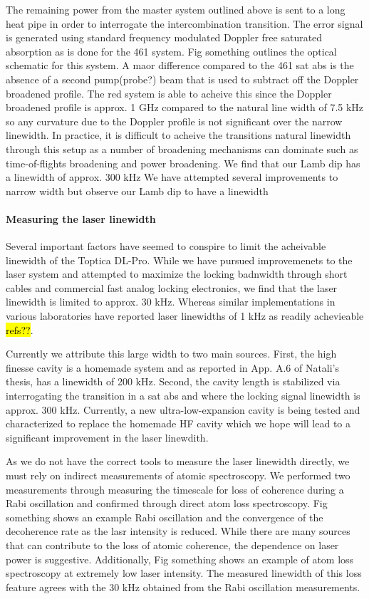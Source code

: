 The remaining power from the master system outlined above is sent to a long heat pipe in order to interrogate the intercombination transition.
The error signal is generated using standard frequency modulated Doppler free saturated absorption as is done for the 461 system.
Fig something outlines the optical schematic for this system.
A maor difference compared to the 461 sat abs is the absence of a second pump(probe?) beam that is used to subtract off the Doppler broadened profile.
The red system is able to acheive this since the Doppler broadened profile is approx. 1 GHz compared to the natural line width of 7.5 kHz so any curvature due to the Doppler profile is not significant over the narrow linewidth.
In practice, it is difficult to acheive the transitions natural linewidth through this setup as a number of broadening mechanisms can dominate such as time-of-flights broadening and power broadening.
We find that our Lamb dip has a linewidth of approx. 300 kHz
We have attempted several improvements to narrow width but observe our Lamb dip to have a linewidth 


\paragraph{Measuring the laser linewidth}
Several important factors have seemed to conspire to limit the acheivable linewidth of the Toptica DL-Pro.
While we have pursued improvemenets to the laser system and attempted to maximize the locking badnwidth through short cables and commercial fast analog locking electronics, we find that the laser linewidth is limited to approx. 30 kHz.
Whereas similar implementations in various laboratories have reported laser linewidths of 1 kHz as readily achevieable \hl{refs??}.

Currently we attribute this large width to two main sources. 
First, the high finesse cavity is a homemade system and as reported in App. A.6 of Natali's thesis, has a linewidth of 200 kHz. 
Second, the cavity length is stabilized via interrogating the transition in a sat abs and where the locking signal linewidth is approx. 300 kHz.
Currently, a new ultra-low-expansion cavity is being tested and characterized to replace the homemade HF cavity which we hope will lead to a significant improvement in the laser linewdith.

As we do not have the correct tools to measure the laser linewidth directly, we must rely on indirect measurements of atomic spectroscopy.
We performed two measurements through measuring the timescale for loss of coherence during a Rabi oscillation and confirmed through direct atom loss spectroscopy.
Fig something shows an example Rabi oscillation and the convergence of the decoherence rate as the lasr intensity is reduced.
While there are many sources that can contribute to the loss of atomic coherence, the dependence on laser power is suggestive.
Additionally, Fig something shows an example of atom loss spectroscopy at extremely low laser intensity.
The measured linewidth of this loss feature agrees with the 30 kHz obtained from the Rabi oscillation measurements.

